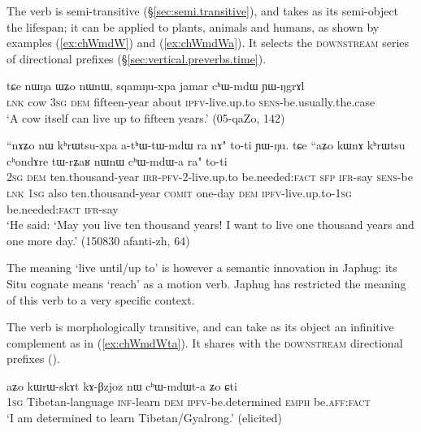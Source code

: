 The verb  is semi-transitive (§\ref{sec:semi.transitive}), and takes as its semi-object the lifespan; it can be applied to plants, animals and humans, as shown by examples (\ref{ex:chWmdW}) and (\ref{ex:chWmdWa}). It selects the \textsc{downstream} series of directional prefixes (§\ref{sec:vertical.preverbs.time}).

 \begin{exe}
\ex \label{ex:chWmdW}
\gll tɕe nɯŋa ɯʑo nɯnɯ, sqamŋu-xpa jamar cʰɯ-mdɯ ɲɯ-ŋgrɤl\\
\textsc{lnk} cow \textsc{3sg} \textsc{dem} fifteen-year about \textsc{ipfv}-live.up.to \textsc{sens}-be.usually.the.case \\
\glt `A cow itself can live up to fifteen years.' (05-qaZo, 142)
\end{exe}

 \begin{exe}
\ex \label{ex:chWmdWa}
\gll ``nɤʑo nɯ kʰrɯtsu-xpa a-tʰɯ-tɯ-mdɯ ra nɤ" to-ti ɲɯ-ŋu. tɕe ``aʑo kɯnɤ kʰrɯtsu cʰondɤre tɯ-rʑaʁ nɯnɯ cʰɯ-mdɯ-a ra" to-ti \\
\textsc{2sg} \textsc{dem} ten.thousand-year \textsc{irr}-\textsc{pfv}-2-live.up.to be.needed:\textsc{fact} \textsc{sfp} \textsc{ifr}-say \textsc{sens}-be \textsc{lnk} \textsc{1sg} also  ten.thousand-year \textsc{comit} one-day \textsc{dem} \textsc{ipfv}-live.up.to-\textsc{1sg} be.needed:\textsc{fact} \textsc{ifr}-say \\
\glt `He said: `May you live ten thousand years! I want to live one thousand years and one more day.' (150830 afanti-zh, 64)
\end{exe}

The meaning `live until/up to' is however a semantic innovation in Japhug: its Situ cognate  means `reach' as a motion verb. Japhug has restricted the meaning of this verb to a very specific context.

The verb  is morphologically transitive, and can take as its object an infinitive complement as in (\ref{ex:chWmdWta}). It shares with  the \textsc{downstream} directional prefixes ().

 \begin{exe}
\ex \label{ex:chWmdWta}
\gll aʑo kɯrɯ-skɤt kɤ-βzjoz nɯ cʰɯ-mdɯt-a ʑo ɕti \\
\textsc{1sg} Tibetan-language \textsc{inf}-learn \textsc{dem} \textsc{ipfv}-be.determined \textsc{emph} be.\textsc{aff}:\textsc{fact} \\
\glt `I am determined to learn Tibetan/Gyalrong.' (elicited)
\end{exe}

